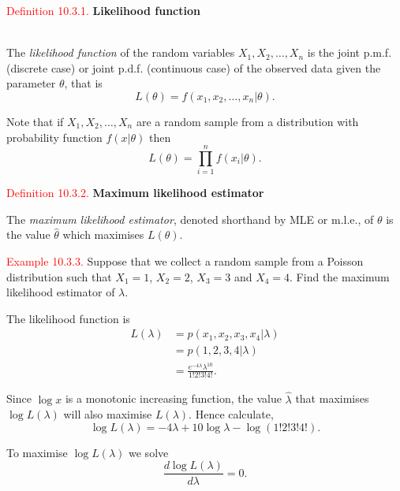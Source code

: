\documentclass[
]{book}
\begin{document}
\hypertarget{MLE:def:like}{}
\textcolor{red}{Definition 10.3.1.}
{\textbf{Likelihood function}}\\
\strut \\
The \emph{likelihood function} of the random variables \(X_1,X_2,\dots,X_n\) is the joint p.m.f. (discrete case) or joint p.d.f. (continuous case) of the observed data given the parameter \(\theta\), that is\\

\[L(\theta) = f(x_1,x_2,\dots,x_n | \theta).\]

Note that if \(X_1,X_2,\ldots,X_n\) are a random sample from a distribution with probability function \(f(x|\theta)\) then\\

\[ L(\theta) = \prod_{i=1}^n f(x_i|\theta).\]

\leavevmode{}%
\textcolor{red}{Definition 10.3.2.}
{\textbf{Maximum likelihood estimator}}

The \emph{maximum likelihood estimator}, denoted shorthand by MLE or m.l.e., of \(\theta\) is the value \(\hat{\theta}\) which maximises \(L(\theta)\).

\leavevmode{}%
\textcolor{red}{Example 10.3.3.}
Suppose that we collect a random sample from a Poisson distribution such that \(X_1=1\), \(X_2=2\), \(X_3=3\) and \(X_4=4\). Find the maximum likelihood estimator of \(\lambda\).

\hfill\break

The likelihood function is\\

\begin{align*}
L(\lambda) &= p(x_1, x_2, x_3, x_4 |\lambda) \\
&= p(1,2,3,4| \lambda) \\
&= \frac{e^{-4\lambda}\lambda^{10}}{1!2!3!4!}.
\end{align*}

Since \(\log x\) is a monotonic increasing function, the value \(\hat{\lambda}\) that maximises \(\log L(\lambda)\) will also maximise \(L(\lambda)\). Hence calculate,\\

\[\log L(\lambda) = -4 \lambda + 10 \log \lambda - \log (1!2!3!4!).\]

To maximise \(\log L(\lambda)\) we solve\\

\[\frac{d \log L(\lambda)}{d\lambda}=0.\]
\end{document}
